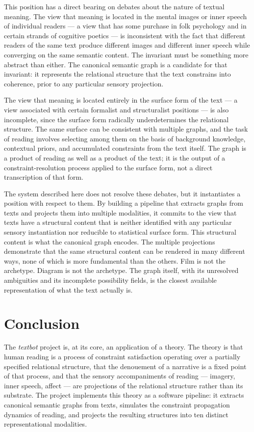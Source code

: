 \documentclass[12pt, a4paper]{article}
\begin{document}
This position has a direct bearing on debates about the nature of textual meaning. The view that meaning is located in the mental images or inner speech of individual readers — a view that has some purchase in folk psychology and in certain strands of cognitive poetics — is inconsistent with the fact that different readers of the same text produce different images and different inner speech while converging on the same semantic content. The invariant must be something more abstract than either. The canonical semantic graph is a candidate for that invariant: it represents the relational structure that the text constrains into coherence, prior to any particular sensory projection.

The view that meaning is located entirely in the surface form of the text — a view associated with certain formalist and structuralist positions — is also incomplete, since the surface form radically underdetermines the relational structure. The same surface can be consistent with multiple graphs, and the task of reading involves selecting among them on the basis of background knowledge, contextual priors, and accumulated constraints from the text itself. The graph is a product of reading as well as a product of the text; it is the output of a constraint-resolution process applied to the surface form, not a direct transcription of that form.

The system described here does not resolve these debates, but it instantiates a position with respect to them. By building a pipeline that extracts graphs from texts and projects them into multiple modalities, it commits to the view that texts have a structural content that is neither identified with any particular sensory instantiation nor reducible to statistical surface form. This structural content is what the canonical graph encodes. The multiple projections demonstrate that the same structural content can be rendered in many different ways, none of which is more fundamental than the others. Film is not the archetype. Diagram is not the archetype. The graph itself, with its unresolved ambiguities and its incomplete possibility fields, is the closest available representation of what the text actually is.

\section{Conclusion}

The \textit{textbot} project is, at its core, an application of a theory. The theory is that human reading is a process of constraint satisfaction operating over a partially specified relational structure, that the denouement of a narrative is a fixed point of that process, and that the sensory accompaniments of reading — imagery, inner speech, affect — are projections of the relational structure rather than its substrate. The project implements this theory as a software pipeline: it extracts canonical semantic graphs from texts, simulates the constraint propagation dynamics of reading, and projects the resulting structures into ten distinct representational modalities.
\end{document}

